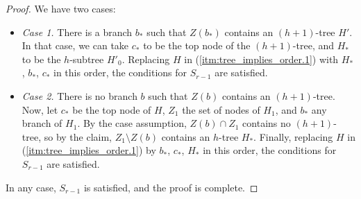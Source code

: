 \begin{theorem}
\begin{proof}
            We have two cases:
            \begin{itemize}
                \item \emph{Case 1.} There is a branch $b_*$ such that $Z(b_*)$ contains an $(h+1)$-tree $H'$.
                    In that case, we can take $c_*$ to be the top node of the $(h+1)$-tree, and $H_*$ to be the
                    $h$-subtree $H'_0$.
                    Replacing $H$ in (\ref{itm:tree_implies_order.1}) with $H_*$, $b_*$, $c_*$ in this order, the
                    conditions for $S_{r-1}$ are satisfied.
                \item \emph{Case 2.} There is no branch $b$ such that $Z(b)$ contains an $(h+1)$-tree.
                    Now, let $c_*$ be the top node of $H$, $Z_1$ the set of nodes of $H_1$, and
                    $b_*$ any branch of $H_1$.
                    By the case assumption, $Z(b) \cap Z_1$ contains no $(h+1)$-tree, so by the claim,
                    $Z_1 \setminus Z(b)$ contains an $h$-tree $H_*$.
                    Finally, replacing $H$ in (\ref{itm:tree_implies_order.1}) by $b_*$, $c_*$, $H_*$ in this order, the
                    conditions for $S_{r-1}$ are satisfied.
            \end{itemize}
            In any case, $S_{r-1}$ is satisfied, and the proof is complete.
        \end{proof}
    \end{theorem}
